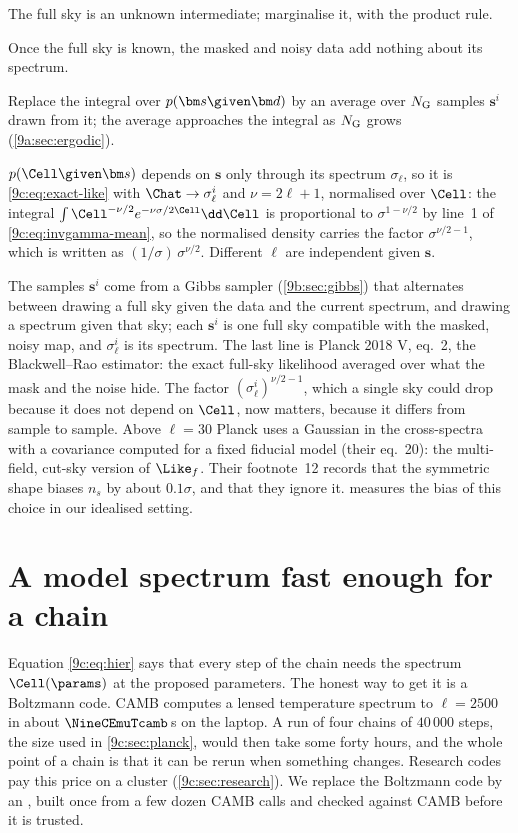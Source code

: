 \begin{explain}
  \item The full sky is an unknown intermediate; marginalise it, with the product rule.
  \item Once the full sky is known, the masked and noisy data add nothing about its spectrum.
  \item Replace the integral over $p(\bm s\given\bm d)$ by an average over $N_{\rm G}$ samples $\bm s^i$ drawn from it;
        the average approaches the integral as $N_{\rm G}$ grows (\cref{9a:sec:ergodic}).
  \item $p(\Cell\given\bm s)$ depends on $\bm s$ only through its spectrum $\sigma_\ell$, so it is
        \eqref{9c:eq:exact-like} with $\Chat\to\sigma^i_\ell$ and $\nu=2\ell+1$, normalised over $\Cell$: the integral
        $\int\Cell^{-\nu/2}e^{-\nu\sigma/2\Cell}\dd\Cell$ is proportional to $\sigma^{1-\nu/2}$ by line~1 of
        \eqref{9c:eq:invgamma-mean}, so the normalised density carries the factor $\sigma^{\nu/2-1}$, which is
        written as $(1/\sigma)\,\sigma^{\nu/2}$. Different $\ell$ are independent given $\bm s$.
\end{explain}
The samples $\bm s^i$ come from a Gibbs sampler (\cref{9b:sec:gibbs}) that alternates between drawing a full sky
given the data and the current spectrum, and drawing a spectrum given that sky; each $\bm s^i$ is one full sky
compatible with the masked, noisy map, and $\sigma^i_\ell$ is its spectrum. The last line is Planck 2018 V, eq.~2,
the Blackwell--Rao estimator: the exact full-sky likelihood averaged over what the mask and the noise hide. The
factor $(\sigma^i_\ell)^{\nu/2-1}$, which a single sky could drop because it does not depend on $\Cell$, now
matters, because it differs from sample to sample. Above
$\ell=30$ Planck uses a Gaussian in the cross-spectra with a covariance computed for a fixed fiducial model
(their eq.~20): the multi-field, cut-sky version of $\Like_f$. Their footnote~12 records that the symmetric shape
biases $n_s$ by about $0.1\sigma$, and that they ignore it.  measures the bias of this
choice in our idealised setting.
\section{A model spectrum fast enough for a chain}
\label{9c:sec:emu}

Equation \eqref{9c:eq:hier} says that every step of the chain needs the spectrum $\Cell(\params)$ at the
proposed parameters. The honest way to get it is a Boltzmann code. CAMB \cite{CAMB2000} computes a
lensed temperature spectrum to $\ell=2500$ in about $\NineCEmuTcamb$\,s on the laptop. A run of four
chains of $40\,000$ steps, the size used in \cref{9c:sec:planck}, would then take some forty hours, and the
whole point of a chain is that it can be rerun when something changes. Research codes pay this price on a
cluster (\cref{9c:sec:research}). We replace the Boltzmann code by an  ,
built once from a few dozen CAMB calls and checked against CAMB before it is trusted.

